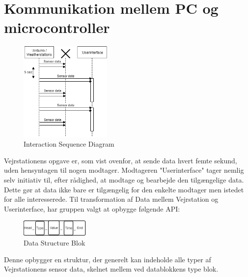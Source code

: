 \section{Kommunikation mellem PC og microcontroller}
\begin{figure}[H]
    \centering
    \includegraphics[width=0.4\textwidth, angle =0]{Struktureret_System_Udvikling/Workshop_2/Assets/Workshop2_SequenceDiagram.png}
    \caption{Interaction Sequence Diagram}
    \label{fig:my_label}
\end{figure}
\noindent
Vejrstationens opgave er, som vist ovenfor, at sende data hvert femte sekund, uden hensyntagen til nogen modtager. Modtageren "Userinterface" tager nemlig selv initiativ til, efter rådighed, at modtage og bearbejde den tilgængelige data.
Dette gør at data ikke bare er tilgængelig for den enkelte modtager men istedet for alle interesserede.
Til transformation af Data mellem Vejrstation og Userinterface, har gruppen valgt at opbygge følgende API:
\begin{figure}[H]
    \centering
    \includegraphics[width=0.3\textwidth, angle =0]{Struktureret_System_Udvikling/Workshop_2/Assets/Workshop2_DataStructure.png}
    \caption{Data Structure Blok}
    \label{fig:my_label}
\end{figure}
\noindent
Denne opbygger en struktur, der generelt kan indeholde alle typer af Vejrstationens sensor data, skelnet mellem ved datablokkens type blok.



